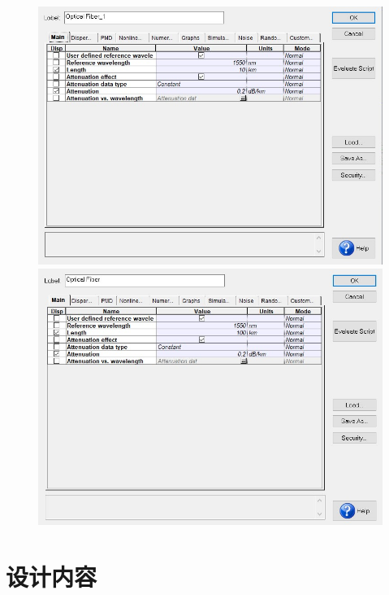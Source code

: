 \documentclass[12pt]{article}
\begin{document}
\begin{figure}[H]
  \begin{minipage}[t]{0.5\linewidth}
      \centering
      \includegraphics[scale=0.4]{figure4.png}
      \caption{}
      \label{fig:side:a}
    \end{minipage}%
    \begin{minipage}[t]{0.5\linewidth}
      \centering
      \includegraphics[scale=0.4]{figure5.png}
      \caption{}
      \label{fig:side:b}
    \end{minipage}
\end{figure}

\clearpage
\section{设计内容}
\end{document}
